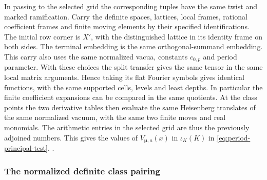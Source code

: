 In passing to the selected grid the corresponding tuples
have the same twist and marked ramification. Carry the
definite spaces, lattices, local frames, rational coefficient
frames and finite moving elements by their specified
identifications. The initial row corner is \(X'\), with
the distinguished lattice in its identity frame on both
sides. The terminal embedding is the same orthogonal-summand
embedding. This carry also uses the same normalized
vacua, constants \(c_{0,p}\) and period parameter. With
these choices the split transfer gives the same tensor
in the same local matrix arguments. Hence taking its
flat Fourier symbols gives identical functions, with the
same supported cells, levels and least depths. In particular
the finite coefficient expansions can be compared in the
same quotients. At the class points the two derivative
tables then evaluate the same Heisenberg translates of
the same normalized vacuum, with the same two finite
moves and real monomials. The arithmetic entries in the
selected grid are thus the previously adjoined numbers.
This gives the values of \(V_{\boldsymbol\mu,a}(x)\) in \(\iota_K(K)\) in
\eqref{eq:period-principal-test}.
.


\subsubsection{The normalized definite class pairing}

